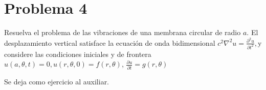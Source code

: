 \section{Problema 4}

Resuelva el problema de las vibraciones de una membrana circular de radio $a$. El
desplazamiento vertical satisface la ecuación de onda bidimensional $c^{2} \nabla^{2} u=\frac{\partial^{2} u}{\partial t^{2}}, \mathrm{y}$
considere las condiciones iniciales y de frontera $u(a, \theta, t)=0, u(r, \theta, 0)=f(r, \theta)$,
$\frac{\partial u}{\partial t}=g(r, \theta)$

\begin{solution}
Se deja como ejercicio al auxiliar.
\end{solution}